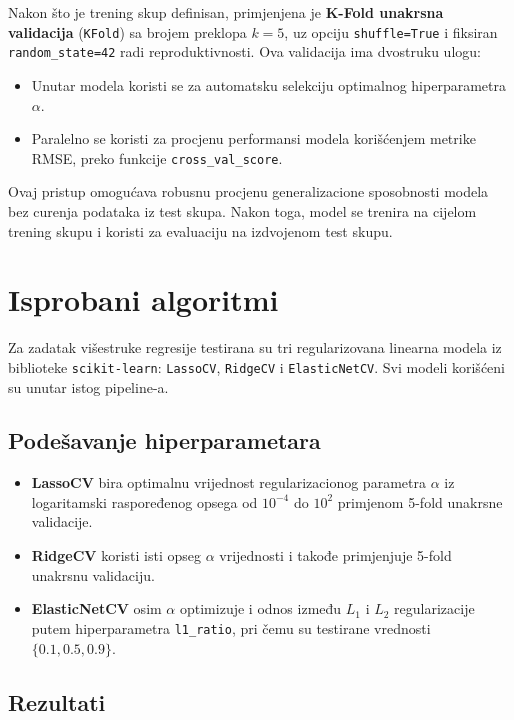\documentclass[a4paper,12pt]{article}
\begin{document}
Nakon što je trening skup definisan, primjenjena je \textbf{K-Fold unakrsna validacija} (\texttt{KFold}) sa brojem preklopa $k = 5$, uz opciju \texttt{shuffle=True} i fiksiran \texttt{random\_state=42} radi reproduktivnosti. Ova validacija ima dvostruku ulogu:

\begin{itemize}
    \item Unutar modela koristi se za automatsku selekciju optimalnog hiperparametra $\alpha$.
    \item Paralelno se koristi za procjenu performansi modela korišćenjem metrike RMSE, preko funkcije \texttt{cross\_val\_score}.
\end{itemize}

Ovaj pristup omogućava robusnu procjenu generalizacione sposobnosti modela bez curenja podataka iz test skupa. Nakon toga, model se trenira na cijelom trening skupu i koristi za evaluaciju na izdvojenom test skupu.

\section{Isprobani algoritmi}

Za zadatak višestruke regresije testirana su tri regularizovana linearna modela iz biblioteke \texttt{scikit-learn}: \texttt{LassoCV}, \texttt{RidgeCV} i \texttt{ElasticNetCV}. Svi modeli korišćeni su unutar istog pipeline-a.

\subsection{Podešavanje hiperparametara}

\begin{itemize}
    \item \textbf{LassoCV} bira optimalnu vrijednost regularizacionog parametra $\alpha$ iz logaritamski raspoređenog opsega od $10^{-4}$ do $10^{2}$ primjenom 5-fold unakrsne validacije.
    \item \textbf{RidgeCV} koristi isti opseg $\alpha$ vrijednosti i takođe primjenjuje 5-fold unakrsnu validaciju.
    \item \textbf{ElasticNetCV} osim $\alpha$ optimizuje i odnos između $L_1$ i $L_2$ regularizacije putem hiperparametra \texttt{l1\_ratio}, pri čemu su testirane vrednosti $\{0.1, 0.5, 0.9\}$.
\end{itemize}

\subsection{Rezultati}
\end{document}
